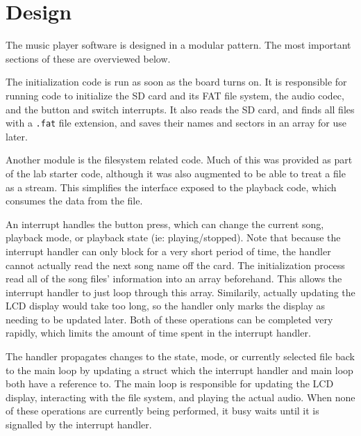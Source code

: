 \documentclass[12pt]{article}
\begin{document}
\doublespacing

\section{Design}

The music player software is designed in a modular pattern.
The most important sections of these are overviewed below.

The initialization code is run as soon as the board turns on.
It is responsible for running code to initialize the SD card and its FAT file
system, the audio codec, and the button and switch interrupts.
It also reads the SD card, and finds all files with a \texttt{.fat} file
extension, and saves their names and sectors in an array for use later.

Another module is the filesystem related code.
Much of this was provided as part of the lab starter code, although it was also
augmented to be able to treat a file as a stream.
This simplifies the interface exposed to the playback code, which consumes the
data from the file.

An interrupt handles the button press, which can change the current song,
playback mode, or playback state (ie: playing/stopped).
Note that because the interrupt handler can only block for a very short period
of time, the handler cannot actually read the next song name off the card.
The initialization process read all of the song files' information into an
array beforehand.
This allows the interrupt handler to just loop through this array.
Similarily, actually updating the LCD display would take too long, so the
handler only marks the display as needing to be updated later.
Both of these operations can be completed very rapidly, which limits the amount
of time spent in the interrupt handler.

The handler propagates changes to the state, mode, or currently selected file
back to the main loop by updating a struct which the interrupt handler and main
loop both have a reference to.
The main loop is responsible for updating the LCD display, interacting with
the file system, and playing the actual audio.
When none of these operations are currently being performed,
it busy waits until it is signalled by the interrupt handler.
\end{document}

